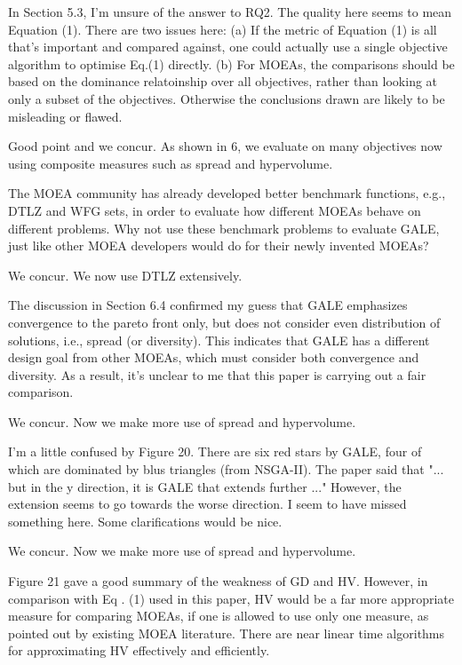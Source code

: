 \documentclass[10pt,journal,compsoc]{IEEEtran}
\newenvironment{changed}{\par\color{MyDarkBlue}}{\par}
\begin{document}
In Section 5.3, I'm unsure of the answer to RQ2. The quality here seems
to mean Equation (1). There are two issues here: (a) If the metric of
Equation (1) is all that's important and compared against, one could
actually use a single objective algorithm to optimise Eq.(1) directly. (b)
For MOEAs, the comparisons should be based on the dominance relatoinship
over all objectives, rather than looking at only a subset of the
objectives. Otherwise the conclusions drawn are likely to be misleading or
flawed.
\begin{changed}
Good point and we concur. As shown in {\textsection}6, we evaluate on many objectives
now using composite measures such as spread and hypervolume.
\end{changed}


The MOEA community has already
developed better benchmark functions, e.g., DTLZ and WFG sets, in order to
evaluate how different MOEAs behave on different problems. Why not use
these benchmark problems to evaluate GALE, just like other MOEA developers
would do for their newly invented MOEAs?

\begin{changed}
We concur. We now use DTLZ extensively.
\end{changed}


The discussion in Section 6.4 confirmed my guess that GALE emphasizes
convergence to the pareto front only, but does not consider even
distribution of solutions, i.e., spread (or diversity). This indicates
that GALE has a different design goal from other MOEAs, which must
consider both convergence and diversity. As a result, it's unclear to me
that this paper is carrying out a fair comparison.


\begin{changed}
We concur. Now we make more use of spread and hypervolume.
\end{changed}

I'm a little confused by Figure 20. There are six red stars by GALE, four
of which are dominated by blus triangles (from NSGA-II). The paper said that
"... but in the y direction, it is GALE that extends further ..." However, the
extension seems to go towards the worse direction. I seem to have missed
something here. Some clarifications would be nice.


\begin{changed}
We concur. Now we make more use of spread and hypervolume.
\end{changed}


Figure 21 gave a good summary of the weakness of GD and HV. However, in
comparison with Eq . (1) used in this paper, HV would be a far more
appropriate measure for comparing MOEAs, if one is allowed to use only one
measure, as pointed out by existing MOEA literature. There are near linear
time algorithms for approximating HV effectively and efficiently.
\end{document}
